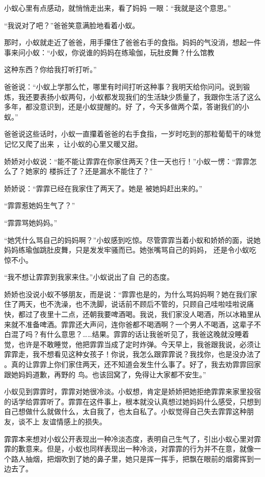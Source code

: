 \documentclass{article}
\begin{document}
小蚁心里有点感动，就悄悄走出来，看了妈妈
一眼：“我就是这个意思。” 

“我说对了吧？”爸爸笑意满脸地看着小蚁。

那时，小蚁就走近了爸爸，用手攥住了爸爸右手的食指。妈妈的气没消，想起一件事来问小蚁：“小蚁，你说谁的妈妈在练瑜伽，玩肚皮舞？什么馆教
\newpage

这种东西？你给我打听打听。” 

爸爸说：“小蚁上学那么忙，哪里有时间打听这种事？我明天给你问问。说到锻炼，我还要表扬小蚁两句，小蚁都发现我们的生活缺少质量了，我跟你生活了这么多年，都没意识到，还是小蚁提醒的。好
了，今天多做两个菜，答谢我们的小蚁。” 

爸爸说这些话时，小蚁一直攥着爸爸的右手食指，一岁时吃到的那粒葡萄干的味觉记忆又爬了出来
，让小蚁的心里又暖又甜。 

娇娇对小蚁说：“能不能让霏霏在你家住两天？住一天也行！”小蚁一愣：“霏霏怎么了？她家的
楼拆迁了？还是漏水不能住了？” 

娇娇说：“霏霏已经在我家住了两天了。她是
被她妈赶出来的。” 


“霏霏惹她妈生气了？” 

\newpage


“霏霏骂她妈妈。” 

“她凭什么骂自己的妈妈啊？”小蚁感到吃惊。尽管霏霏当着小蚁和娇娇的面，说她妈妈练瑜伽跳肚皮舞，只是发发牢骚而已。她张嘴骂自己的妈妈，
还是令小蚁吃惊不小。 

“我不想让霏霏到我家来住。”小蚁说出了自
己的态度。 

娇娇也没说小蚁不够朋友，而是说：“霏霏也是的，为什么骂妈妈啊？她在我们家住了两天，也不洗澡，也不洗脚，说话前不顾后不管的，只顾自己哇啦哇啦说痛快，都过了夜里十二点，还朝我要啤酒喝。我说，我们家没人喝酒，所以冰箱里从来就不准备啤酒。霏霏还大声问，连你爸都不喝酒啊？一个男人不喝酒，这辈子不白混了吗？有什么意思？……结果。霏霏的话让我爸听见了，我爸这晚就没睡着觉，也许是不敢睡觉，他把霏霏当成了定时炸弹。今天早上，我爸跟我说，必须让霏霏走，我不想看见这种女孩子！你说，我怎么跟霏霏说？我找你，也是没办法了
\newpage
。真的让霏霏上你们家住两天，还不知道会发生什么事了。好了，我去劝霏霏回家跟她妈妈道歉，再野的
鸟。也该回窝了，免得让大家都不安生。” 

小蚁见到霏霏时，霏霏对她很冷淡。小蚁想，肯定是娇娇把她拒绝霏霏来家里投宿的话学给霏霏听了。霏霏在这件事上，根本就没认真想过她妈妈什么感受，只想到自己想做什么就做什么，太自我了，也太自私了。小蚁觉得自己失去霏霏这种朋友，谈不上
友谊情感上的损失。 

霏霏本来想对小蚁公开表现出一种冷淡态度，表明自己生气了，引出小蚁心里对霏霏的歉意来。但是，小蚁也同样表现出一种冷淡，对霏霏的行为并不在意，就像一个路人抽烟，把烟吹到了她的鼻子里，她只是挥一挥手，把飘在眼前的烟雾挥到一边去了。
\end{document}
